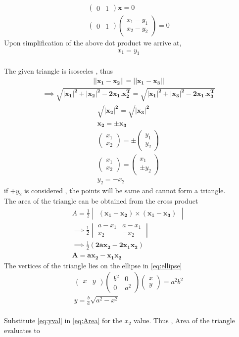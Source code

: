 \documentclass[journal,10pt,twocolumn]{article}
\let\vec\mathbf
\newcommand{\myvec}[1]{\ensuremath{\begin{pmatrix}#1\end{pmatrix}}}
\newcommand{\mydet}[1]{\ensuremath{\begin{vmatrix}#1\end{vmatrix}}}
\providecommand{\brak}[1]{\ensuremath{\left(#1\right)}}
\begin{document}
\begin{align}
           \myvec{0&1}\vec{x}=0
	 \\  \myvec{0&1}\myvec{x_1-y_1 \\ x_2-y_2} = 0
\end{align}
Upon simplification of the above dot product we arrive at,
\begin{align}
	x_1 = y_1
\end{align}
\\The given triangle is isosceles , thus 
\begin{align}
\vec{||x_1-x_2||} = \vec{||x_1-x_3||}
\end{align}
\begin{align}
\implies \vec{\sqrt{|x_1|^2+|x_2|^2-2x_1.x_2^T}} = \vec{\sqrt{|x_1|^2+|x_3|^2-2x_1.x_3^T}} 
\end{align}
\begin{align}
	\vec{\sqrt{|x_2|^2}} = \vec{\sqrt{|x_3|^2}}
	\\   \vec{x_2} = \pm \vec{x_3}
	\\ \myvec{ x_1 \\ x_2 } = \pm \myvec{ y_1 \\ y_2}
	\\  \myvec{x_1 \\ x_2} = \myvec{x_1 \\ \pm y_2}
	\\ y_2 = -x_2
\end{align}
if $+y_2$ is considered , the points will be same and cannot form a triangle.
\\The area of the triangle can be obtained from the cross product 
\begin{align}
	A = \frac{1}{2} \mydet{\vec{\brak{x_1-x_2}} \times \vec{\brak{x_1-x_3}}}
	\\ \implies \frac{1}{2} \mydet{a-x_1 & a-x_1 \\ x_2 & -x_2}
	\\ \implies \frac{1}{2} \brak{ \vec{2ax_2-2x_1x_2}}	
	\\ \vec{A} = \vec{ax_2-x_1x_2}
	\label{eq:Area}
\end{align}
The vertices of the triangle lies on the ellipse in \eqref{eq:ellipse}
\begin{align}
	\myvec{x &y} \myvec{b^2 & 0 \\ 0& a^2} \myvec{x \\y} = a^2b^2
	\\ y = \frac{b}{a}\sqrt{a^2-x^2}
	\label{eq:yval}
\end{align} 
\\Substitute \eqref{eq:yval} in \eqref{eq:Area} for the $x_2$ value. Thus , Area of the triangle  evaluates to  
\end{document}

